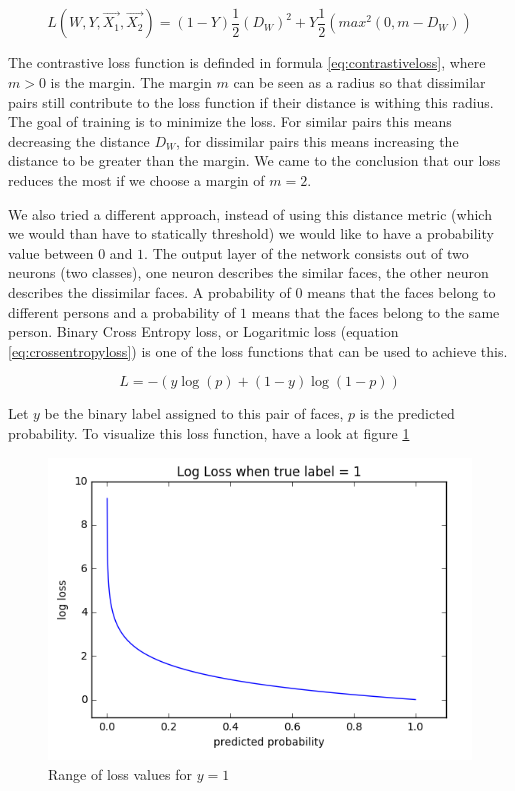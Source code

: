 \begin{equation} \label{eq:contrastiveloss}
  L(W,Y,\vec{X_{1}},\vec{X_{2}})=(1-Y)\frac{1}{2}(D_{W})^{2} + Y\frac{1}{2}(max^{2}(0, m - D_{W}))
\end{equation}

The contrastive loss function is definded in formula \ref{eq:contrastiveloss}, where $m > 0$ is the margin. The margin $m$ can be seen as a radius so that dissimilar pairs still contribute to the loss function if their distance is withing this radius. The goal of training is to minimize the loss. For similar pairs this means decreasing the distance $D_{W}$, for dissimilar pairs this means increasing the distance to be greater than the margin. We came to the conclusion that our loss reduces the most if we choose a margin of $m=2$.

We also tried a different approach, instead of using this distance metric (which we would than have to statically threshold) we would like to have a probability value between $0$ and $1$. The output layer of the network consists out of two neurons (two classes), one neuron describes the similar faces, the other neuron describes the dissimilar faces. A probability of $0$ means that the faces belong to different persons and a probability of $1$ means that the faces belong to the same person. Binary Cross Entropy loss, or Logaritmic loss (equation \ref{eq:crossentropyloss}) is one of the loss functions that can be used to achieve this.

\begin{equation} \label{eq:crossentropyloss}
  L=-{(y\log(p) + (1 - y)\log(1 - p))}
\end{equation}

Let $y$ be the binary label assigned to this pair of faces, $p$ is the predicted probability. To visualize this loss function, have a look at figure \ref{fig:crossentropyloss}

\begin{figure}[H]
  \includegraphics[scale=0.6]{fig/cross_entropy.png}
  \centering
  \caption{Range of loss values for $y=1$}
  \label{fig:crossentropyloss}
\end{figure}

